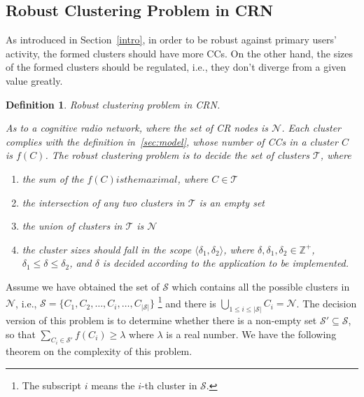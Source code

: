 \documentclass[10pt,journal,compsoc]{IEEEtran}
\theoremstyle{mytheoremstyle}
\theoremstyle{mytheoremstyle}
\theoremstyle{mytheoremstyle}
\newtheorem{mydef}{Definition}%
\newcommand{\ie}{i.e., }
\begin{document}
\subsection{Robust Clustering Problem in CRN}
\label{problem}

As introduced in Section~\ref{intro}, in order to be robust against primary users' activity, the formed clusters should have more CCs.
On the other hand, the sizes of the formed clusters should be regulated, \ie they don't diverge from a given value greatly.



\begin{mydef}
\label{def_centralized_clustering}
\textit{Robust clustering problem in CRN.}

As to a cognitive radio network, where the set of CR nodes is $\mathcal{N}$.
Each cluster complies with the definition in~\ref{sec:model}, whose number of CCs in a cluster $C$ is $f(C)$.
The robust clustering problem is to decide the set of clusters $\mathcal{T}$, where 
\begin{enumerate}
\item the sum of the $f(C) is the maximal$, where $C\in \mathcal{T}$ 
\item the intersection of any two clusters in $\mathcal{T}$ is an empty set
\item the union of clusters in $\mathcal{T}$ is $\mathcal{N}$
\item the cluster sizes should fall in the scope $\langle\delta_1, \delta_2\rangle$, where $\delta, \delta_1, \delta_2\in \mathbb{Z}^+$, $\delta_1 \leq \delta\leq \delta_2$, and $\delta$ is decided according to the application to be implemented.
\end{enumerate}

\end{mydef}

Assume we have obtained the set of $\mathcal{S}$ which contains all the possible clusters in $\mathcal{N}$, \ie $\mathcal{S}=\{C_1, C_2,\ldots,C_i, \ldots, C_{|\mathcal{S}|}\}$ \footnote{The subscript $i$ means the $i$-th cluster in $\mathcal{S}$.} and there is $\bigcup_{1\leq i \leq |\mathcal{S}|} C_i = \mathcal{N}$.
The decision version of this problem is to determine whether there is a non-empty set $\mathcal{S}'\subseteq \mathcal{S}$, so that $\sum_{C_i\in \mathcal{S}'} f(C_i) \geqslant \lambda$ where $\lambda$ is a real number.
We have the following theorem on the complexity of this problem.
\end{document}
